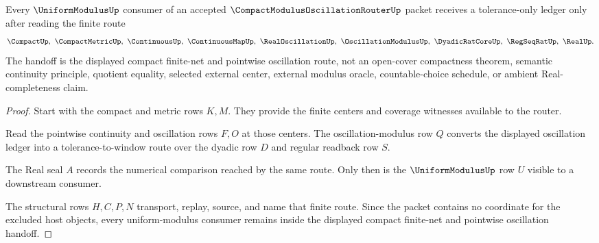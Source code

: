 \begin{theorem}
\label{thm:compact-modulus-oscillation-router-vision-handoff}
Every $\UniformModulusUp$ consumer of an accepted $\CompactModulusOscillationRouterUp$ packet receives a tolerance-only ledger only after reading the finite route
$$
\CompactUp,\ \CompactMetricUp,\ \ContinuousUp,\ \ContinuousMapUp,\ \RealOscillationUp,\ \OscillationModulusUp,\ \DyadicRatCoreUp,\ \RegSeqRatUp,\ \RealUp .
$$
The handoff is the displayed compact finite-net and pointwise oscillation route, not an open-cover compactness theorem, semantic continuity principle, quotient equality, selected external center, external modulus oracle, countable-choice schedule, or ambient Real-completeness claim.
\end{theorem}
\begin{proof}
Start with the compact and metric rows $K,M$. They provide the finite centers and coverage witnesses available to the router.

Read the pointwise continuity and oscillation rows $F,O$ at those centers. The oscillation-modulus row $Q$ converts the displayed oscillation ledger into a tolerance-to-window route over the dyadic row $D$ and regular readback row $S$.

The Real seal $A$ records the numerical comparison reached by the same route. Only then is the $\UniformModulusUp$ row $U$ visible to a downstream consumer.

The structural rows $H,C,P,N$ transport, replay, source, and name that finite route. Since the packet contains no coordinate for the excluded host objects, every uniform-modulus consumer remains inside the displayed compact finite-net and pointwise oscillation handoff.
\end{proof}



